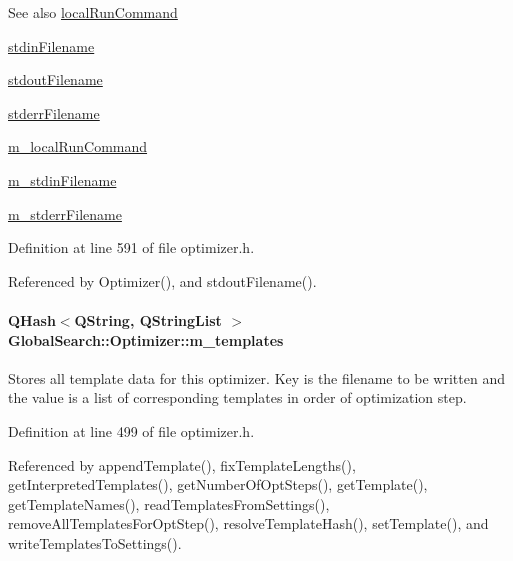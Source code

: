 \begin{DoxySeeAlso}{See also}
\hyperlink{classGlobalSearch_1_1Optimizer_aed5eb285d45a001c9520c2ed3a5b57a1}{local\+Run\+Command} 

\hyperlink{classGlobalSearch_1_1Optimizer_a5964a9b38d3ae90c8ac36a75d3a35832}{stdin\+Filename} 

\hyperlink{classGlobalSearch_1_1Optimizer_a217750aa50431f9948aa8164fb99de0c}{stdout\+Filename} 

\hyperlink{classGlobalSearch_1_1Optimizer_acaa83cc6bf1dcc263b92450b4f8cb652}{stderr\+Filename} 

\hyperlink{classGlobalSearch_1_1Optimizer_a1cdb6b6c5e929e84c834ba93148fb31e}{m\+\_\+local\+Run\+Command} 

\hyperlink{classGlobalSearch_1_1Optimizer_aca91d12d7aecae052d6ab5ae158acec6}{m\+\_\+stdin\+Filename} 

\hyperlink{classGlobalSearch_1_1Optimizer_a75b800a7f90a03d551f6795404d0c8f1}{m\+\_\+stderr\+Filename} 
\end{DoxySeeAlso}


Definition at line 591 of file optimizer.\+h.



Referenced by Optimizer(), and stdout\+Filename().

\hypertarget{classGlobalSearch_1_1Optimizer_aa5892c64826b7cc7a2baa092efc8c66d}{}
\paragraph[{m\+\_\+templates}]{\setlength{\rightskip}{0pt plus 5cm}Q\+Hash$<$Q\+String, Q\+String\+List $>$ Global\+Search\+::\+Optimizer\+::m\+\_\+templates\hspace{0.3cm}{\ttfamily [protected]}}\label{classGlobalSearch_1_1Optimizer_aa5892c64826b7cc7a2baa092efc8c66d}
Stores all template data for this optimizer. Key is the filename to be written and the value is a list of corresponding templates in order of optimization step. 

Definition at line 499 of file optimizer.\+h.



Referenced by append\+Template(), fix\+Template\+Lengths(), get\+Interpreted\+Templates(), get\+Number\+Of\+Opt\+Steps(), get\+Template(), get\+Template\+Names(), read\+Templates\+From\+Settings(), remove\+All\+Templates\+For\+Opt\+Step(), resolve\+Template\+Hash(), set\+Template(), and write\+Templates\+To\+Settings().

